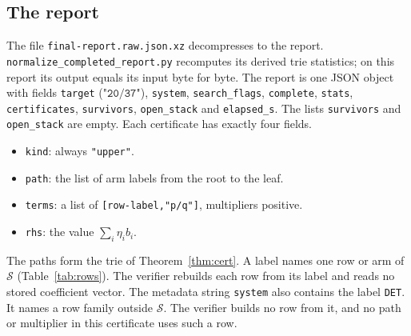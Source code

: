 \documentclass{amsart}
\theoremstyle{definition}
\theoremstyle{plain}
\numberwithin{equation}{section}
\numberwithin{table}{section}
\begin{document}
\subsection{The report}
The file \texttt{final-report.raw.json.xz} decompresses to the report.
\texttt{normalize\_completed\_report.py} recomputes its derived trie
statistics; on this report its output equals its input byte for byte. The
report is one JSON object with fields \texttt{target} ($\texttt{"20/37"}$),
\texttt{system}, \texttt{search\_flags}, \texttt{complete}, \texttt{stats},
\texttt{certificates}, \texttt{survivors}, \texttt{open\_stack} and
\texttt{elapsed\_s}. The lists \texttt{survivors} and \texttt{open\_stack}
are empty. Each certificate has exactly four fields.
\begin{itemize}
\item \texttt{kind}: always \texttt{"upper"}.
\item \texttt{path}: the list of arm labels from the root to the leaf.
\item \texttt{terms}: a list of \texttt{[row-label,"p/q"]}, multipliers
 positive.
\item \texttt{rhs}: the value $\sum_i\eta_i b_i$.
\end{itemize}
The paths form the trie of Theorem~\ref{thm:cert}. A label names one row or
arm of $\mathcal S$ (Table~\ref{tab:rows}). The verifier rebuilds each row
from its label and reads no stored coefficient vector. The metadata string
\texttt{system} also contains the label \texttt{DET}. It names a row
family outside $\mathcal S$. The verifier builds no row from it,
and no path or multiplier in this certificate uses such a row.
\end{document}
